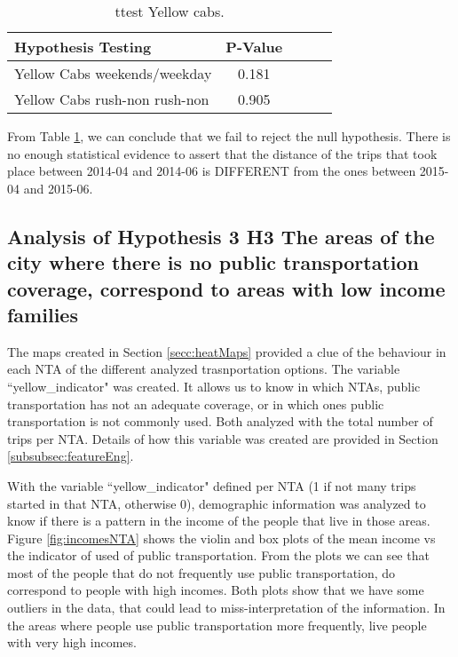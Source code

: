 \begin{table}[h]
\begin{center}
\begin{tabular}{lclcl}
\hline
\textbf{Hypothesis Testing}  & \textbf{P-Value}   \\
\hline
Yellow Cabs weekends/weekday & 0.181 \\
Yellow Cabs rush-non rush-non	  &  0.905  \\
\hline
\end{tabular}
\caption{ttest Yellow cabs.}
\label{tab:ttestYellow}
\end{center}
\end{table}

From Table \ref{tab:ttestYellow}, we can conclude that we fail to reject the null hypothesis. There is no enough statistical evidence to assert that the distance of the trips that took
place between 2014-04 and 2014-06 is DIFFERENT from the ones between 2015-04 and 2015-06.



\subsection{Analysis of Hypothesis 3 \textbf{H3} The areas of the city where there is \textbf{no public transportation} coverage, correspond to areas with \textbf{low income families} 
}

The maps created in Section \ref{secc:heatMaps} provided a clue of the behaviour in each NTA of the different analyzed trasnportation options. The variable ``yellow\_indicator" was created. It allows us to know in which NTAs, public transportation has not an adequate coverage, or in which ones public transportation is not commonly used. Both analyzed with the total number of trips per NTA. Details of how this variable was created are provided in Section \ref{subsubsec:featureEng}.

With the variable ``yellow\_indicator" defined per NTA (1 if not many trips started in that NTA, otherwise 0), demographic information was analyzed to know if there is a pattern in the income of the people that live in those areas. Figure \ref{fig:incomesNTA} shows the violin and box plots of the mean income vs the indicator of used of public transportation. From the plots we can see that most of the people that do not frequently use public transportation, do correspond to people with high incomes. Both plots show that we have some outliers in the data, that could lead to miss-interpretation of the information. In the areas where people use public transportation more frequently, live people with very high incomes.  

